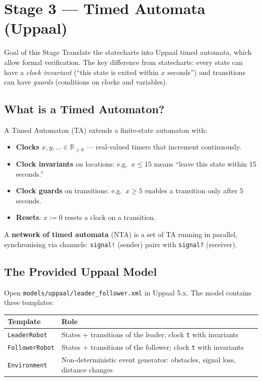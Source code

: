 \documentclass[11pt, a4paper]{article}
\begin{document}
\newpage
\section{Stage 3 — Timed Automata (Uppaal)}

\begin{infobox}{Goal of this Stage}
Translate the statecharts into Uppaal timed automata, which allow formal verification.
The key difference from statecharts: every state can have a \emph{clock invariant}
(``this state is exited within $x$ seconds'') and transitions can have \emph{guards}
(conditions on clocks and variables).
\end{infobox}

\subsection{What is a Timed Automaton?}

A Timed Automaton (TA) extends a finite-state automaton with:
\begin{itemize}
  \item \textbf{Clocks} $x, y, \ldots \in \mathbb{R}_{\geq 0}$ — real-valued timers that increment continuously.
  \item \textbf{Clock invariants} on locations: e.g.\ $x \leq 15$ means ``leave this
        state within 15 seconds.''
  \item \textbf{Clock guards} on transitions: e.g.\ $x \geq 5$ enables a transition only
        after 5 seconds.
  \item \textbf{Resets}: $x := 0$ resets a clock on a transition.
\end{itemize}

A \textbf{network of timed automata} (NTA) is a set of TA running in parallel,
synchronising via channels: \texttt{signal!} (sender) pairs with \texttt{signal?} (receiver).

\subsection{The Provided Uppaal Model}

Open \texttt{models/uppaal/leader\_follower.xml} in Uppaal 5.x.
The model contains three templates:

\begin{center}
\begin{tabularx}{0.88\textwidth}{lX}
\toprule
\textbf{Template} & \textbf{Role} \\
\midrule
\texttt{LeaderRobot}   & States + transitions of the leader; clock \texttt{t} with invariants \\
\texttt{FollowerRobot} & States + transitions of the follower; clock \texttt{t} with invariants \\
\texttt{Environment}   & Non-deterministic event generator: obstacles, signal loss, distance changes \\
\bottomrule
\end{tabularx}
\end{center}
\end{document}
